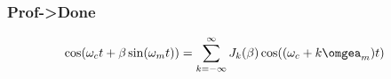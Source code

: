 \documentclass[11pt,aspectratio=169]{beamer}
\begin{document}
\begin{frame}
		\frametitle{Prof->Done}
		\begin{align}
			\cos(\omega_ct+\beta\sin(\omega_mt))
			&=
			\sum_{k= -\infty}^\infty J_{k}(\beta) \cos((\omega_c+k\omgea_m)t)
		\end{align}
	\end{frame}
	\begin{frame}
	\begin{figure}
	\end{figure}
	\end{frame}
\end{document}
